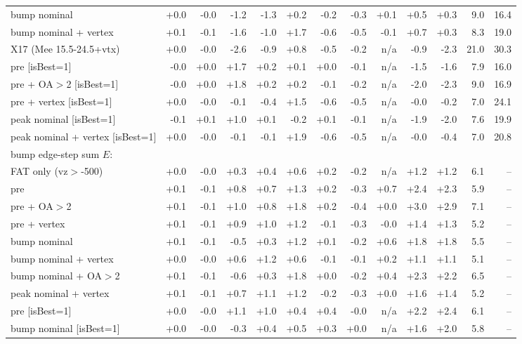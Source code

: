 \begin{table}[p]
{\begin{tabular}{lrrrrrrrrrrrr}
bump nominal & +0.0 & -0.0 & -1.2 & -1.3 & +0.2 & -0.2 & -0.3 & +0.1 & +0.5 & +0.3 & 9.0 & 16.4\\
bump nominal + vertex & +0.1 & -0.1 & -1.6 & -1.0 & +1.7 & -0.6 & -0.5 & -0.1 & +0.7 & +0.3 & 8.3 & 19.0\\
X17 (Mee 15.5-24.5+vtx) & +0.0 & -0.0 & -2.6 & -0.9 & +0.8 & -0.5 & -0.2 & n/a & -0.9 & -2.3 & 21.0 & 30.3\\
pre [isBest=1] & -0.0 & +0.0 & +1.7 & +0.2 & +0.1 & +0.0 & -0.1 & n/a & -1.5 & -1.6 & 7.9 & 16.0\\
pre + OA$>$2 [isBest=1] & -0.0 & +0.0 & +1.8 & +0.2 & +0.2 & -0.1 & -0.2 & n/a & -2.0 & -2.3 & 9.0 & 16.9\\
pre + vertex [isBest=1] & +0.0 & -0.0 & -0.1 & -0.4 & +1.5 & -0.6 & -0.5 & n/a & -0.0 & -0.2 & 7.0 & 24.1\\
peak nominal [isBest=1] & -0.1 & +0.1 & +1.0 & +0.1 & -0.2 & +0.1 & -0.1 & n/a & -1.9 & -2.0 & 7.6 & 19.9\\
peak nominal + vertex [isBest=1] & +0.0 & -0.0 & -0.1 & -0.1 & +1.9 & -0.6 & -0.5 & n/a & -0.0 & -0.4 & 7.0 & 20.8\\
\midrule
\multicolumn{13}{l}{bump edge-step sum $E$:}\\
FAT only (vz$>$-500) & +0.0 & -0.0 & +0.3 & +0.4 & +0.6 & +0.2 & -0.2 & n/a & +1.2 & +1.2 & 6.1 & --\\
pre & +0.1 & -0.1 & +0.8 & +0.7 & +1.3 & +0.2 & -0.3 & +0.7 & +2.4 & +2.3 & 5.9 & --\\
pre + OA$>$2 & +0.1 & -0.1 & +1.0 & +0.8 & +1.8 & +0.2 & -0.4 & +0.0 & +3.0 & +2.9 & 7.1 & --\\
pre + vertex & +0.1 & -0.1 & +0.9 & +1.0 & +1.2 & -0.1 & -0.3 & -0.0 & +1.4 & +1.3 & 5.2 & --\\
bump nominal & +0.1 & -0.1 & -0.5 & +0.3 & +1.2 & +0.1 & -0.2 & +0.6 & +1.8 & +1.8 & 5.5 & --\\
bump nominal + vertex & +0.0 & -0.0 & +0.6 & +1.2 & +0.6 & -0.1 & -0.1 & +0.2 & +1.1 & +1.1 & 5.1 & --\\
bump nominal + OA$>$2 & +0.1 & -0.1 & -0.6 & +0.3 & +1.8 & +0.0 & -0.2 & +0.4 & +2.3 & +2.2 & 6.5 & --\\
peak nominal + vertex & +0.1 & -0.1 & +0.7 & +1.1 & +1.2 & -0.2 & -0.3 & +0.0 & +1.6 & +1.4 & 5.2 & --\\
pre [isBest=1] & +0.0 & -0.0 & +1.1 & +1.0 & +0.4 & +0.4 & -0.0 & n/a & +2.2 & +2.4 & 6.1 & --\\
bump nominal [isBest=1] & +0.0 & -0.0 & -0.3 & +0.4 & +0.5 & +0.3 & +0.0 & n/a & +1.6 & +2.0 & 5.8 & --\\

\end{tabular}}
\end{table}
